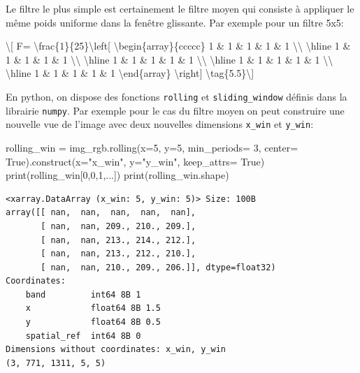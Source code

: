 \documentclass[
]{article}
\newenvironment{Shaded}{}{}
\newcommand{\BuiltInTok}[1]{\textcolor[rgb]{0.00,0.50,0.00}{#1}}
\newcommand{\DecValTok}[1]{\textcolor[rgb]{0.25,0.63,0.44}{#1}}
\newcommand{\NormalTok}[1]{#1}
\newcommand{\OperatorTok}[1]{\textcolor[rgb]{0.40,0.40,0.40}{#1}}
\newcommand{\StringTok}[1]{\textcolor[rgb]{0.25,0.44,0.63}{#1}}
\newcommand{\VariableTok}[1]{\textcolor[rgb]{0.10,0.09,0.49}{#1}}
\begin{document}
Le filtre le plus simple est certainement le filtre moyen qui consiste à
appliquer le même poids uniforme dans la fenêtre glissante. Par exemple
pour un filtre 5x5:

\label{eq-boxfilter}{{\textbackslash{[} F=
\textbackslash frac\{1\}\{25\}\textbackslash left{[}
\textbackslash begin\{array\}\{c\textbar c\textbar c\textbar c\textbar c\}
1 \& 1 \& 1 \& 1 \& 1 \textbackslash\textbackslash{}
\textbackslash hline 1 \& 1 \& 1 \& 1 \& 1
\textbackslash\textbackslash{} \textbackslash hline 1 \& 1 \& 1 \& 1 \&
1 \textbackslash\textbackslash{} \textbackslash hline 1 \& 1 \& 1 \& 1
\& 1 \textbackslash\textbackslash{} \textbackslash hline 1 \& 1 \& 1 \&
1 \& 1 \textbackslash end\{array\} \textbackslash right{]}
\textbackslash tag\{5.5\}\textbackslash{]}}}

En python, on dispose des fonctions \texttt{rolling} et
\texttt{sliding\_window} définis dans la librairie \texttt{numpy}. Par
exemple pour le cas du filtre moyen on peut construire une nouvelle vue
de l'image avec deux nouvelles dimensions \texttt{x\_win} et
\texttt{y\_win}:

\label{b2e95d3e}
\label{cb11}
\begin{Shaded}
\begin{Highlighting}[]
\NormalTok{rolling\_win }\OperatorTok{=}\NormalTok{ img\_rgb.rolling(x}\OperatorTok{=}\DecValTok{5}\NormalTok{, y}\OperatorTok{=}\DecValTok{5}\NormalTok{,  min\_periods}\OperatorTok{=} \DecValTok{3}\NormalTok{, center}\OperatorTok{=} \VariableTok{True}\NormalTok{).construct(x}\OperatorTok{=}\StringTok{"x\_win"}\NormalTok{, y}\OperatorTok{=}\StringTok{"y\_win"}\NormalTok{, keep\_attrs}\OperatorTok{=} \VariableTok{True}\NormalTok{)}
\BuiltInTok{print}\NormalTok{(rolling\_win[}\DecValTok{0}\NormalTok{,}\DecValTok{0}\NormalTok{,}\DecValTok{1}\NormalTok{,...])}
\BuiltInTok{print}\NormalTok{(rolling\_win.shape)}
\end{Highlighting}
\end{Shaded}

\begin{verbatim}
<xarray.DataArray (x_win: 5, y_win: 5)> Size: 100B
array([[ nan,  nan,  nan,  nan,  nan],
       [ nan,  nan, 209., 210., 209.],
       [ nan,  nan, 213., 214., 212.],
       [ nan,  nan, 213., 212., 210.],
       [ nan,  nan, 210., 209., 206.]], dtype=float32)
Coordinates:
    band         int64 8B 1
    x            float64 8B 1.5
    y            float64 8B 0.5
    spatial_ref  int64 8B 0
Dimensions without coordinates: x_win, y_win
(3, 771, 1311, 5, 5)
\end{verbatim}
\end{document}

